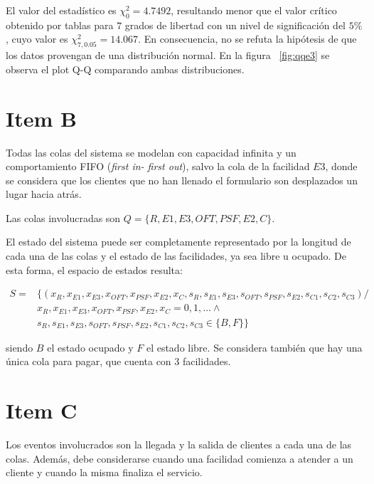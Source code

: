 \documentclass[a4paper,10pt]{article}
\begin{document}
El valor del estad\'istico es $\chi_0^2 = 4.7492$, resultando menor que el valor 
cr\'itico obtenido por tablas para $7$ grados de libertad con un nivel de 
significaci\'on del $5\%$, cuyo valor es $\chi_{7,0.05}^2 = 14.067$. En
consecuencia, no se refuta la hip\'otesis de que los datos provengan de una 
distribuci\'on normal. En la figura  ~\ref{fig:qqe3} se observa el plot Q-Q comparando
ambas distribuciones.

\section*{Item B}

Todas las colas del sistema se modelan con capacidad infinita y un
comportamiento FIFO (\textit{first in- first out}), salvo la cola de la
facilidad $E3$, donde se considera que los clientes que no han llenado el
formulario son desplazados un lugar hacia atr\'as.


Las colas involucradas son $Q = \{R, E1, E3, OFT, PSF, E2, C\}$.


El estado del sistema puede ser completamente representado por la longitud
de cada una de las colas y el estado de las facilidades, ya sea
libre u ocupado. De esta forma, el espacio de estados resulta:

\begin{equation*}
\begin{split}
S = & \{(x_{R}, x_{E1}, x_{E3}, x_{OFT}, x_{PSF}, x_{E2}, x_{C}, s_{R},
s_{E1}, s_{E3}, s_{OFT}, s_{PSF}, s_{E2}, s_{C1}, s_{C2}, s_{C3}) / \\
& 
 x_{R}, x_{E1}, x_{E3}, x_{OFT}, x_{PSF}, x_{E2}, x_{C} = 0, 1, \dots \wedge \\
&
 s_{R},
s_{E1}, s_{E3}, s_{OFT}, s_{PSF}, s_{E2}, s_{C1}, s_{C2}, s_{C3} \in \{B, F\}\}
\end{split}
\end{equation*}

siendo $B$ el estado ocupado y $F$ el estado libre. 
Se considera tambi\'en que hay una \'unica cola para pagar, que cuenta con 3 
facilidades.

\section*{Item C}

Los eventos involucrados son la llegada y la salida de clientes a cada una 
de las colas. Adem\'as, debe considerarse cuando una facilidad comienza a 
atender a un cliente y cuando la misma finaliza el servicio.
\end{document}
